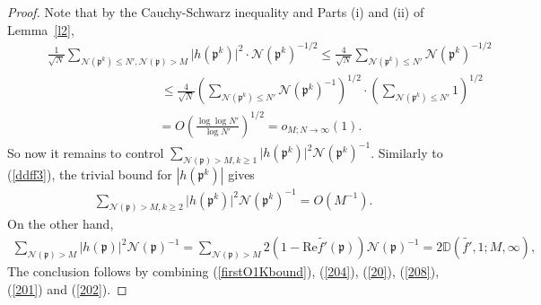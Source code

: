 \documentclass[11pt]{amsart}
\theoremstyle{definition}
\newcommand{\D}{{\mathbb D}}
\newcommand{\NN}{{\mathcal N}}
\newcommand{\mf}{\mathfrak}
\begin{document}
\begin{proof}
Note that by the Cauchy-Schwarz inequality and Parts (i) and (ii) of Lemma~\ref{l2},
\begin{equation}\label{208}
    \begin{split}
      &\qquad\frac{1}{\sqrt{N}}\sum_{\NN(\mf p^{k})\leq N', \NN(\mf p)>M}\vert h(\mf p^{k})\vert^{2}\cdot \NN(\mf p^{k})^{-1/2}
    \leq \frac{4}{\sqrt{N}}\sum_{\NN(\mf p^{k})\leq N'} \NN(\mf p^{k})^{-1/2}
       \\ & \quad\quad\quad\quad\quad\quad\quad\quad\quad\quad\quad\leq \frac{4}{\sqrt{N}}\left(\sum_{\NN(\mf p^{k})\leq N'} \NN(\mf p^{k})^{-1}\right)^{1/2}\cdot \left(\sum_{\NN(\mf p^{k})\leq N'} 1\right)^{1/2}
       \\&\quad\quad\quad\quad\quad\quad\quad\quad\quad\quad\;\;\;=O\left(\frac{\log\log N'}{\log N'}\right)^{1/2}=o_{M;N\to\infty}(1).
    \end{split}
\end{equation}
 So now it remains to control $\sum_{\NN(\mf p)>M, k\geq 1}\vert h(\mf p^{k})\vert^{2}\NN(\mf p^{k})^{-1}$. Similarly to (\ref{ddff3}), the trivial bound for $|h(\mf p^k)|$ gives
\begin{equation}\label{201}
    \begin{split}
       \sum_{\NN(\mf p)>M, k\geq 2}\vert h(\mf p^{k})\vert^{2}\NN(\mf p^{k})^{-1}=O(M^{-1}).
    \end{split}
\end{equation}
 On the other hand,
\begin{equation}\label{202}
    \begin{split}
\sum_{\NN(\mf p)>M}\vert h(\mf p)\vert^{2}\NN(\mf p)^{-1}=\sum_{\NN(\mf p)>M}2(1-\text{Re}\tilde{f'}( \mf p))\NN(\mf p)^{-1}=2\D(\tilde{f'},1;M,\infty),    
\end{split}
\end{equation}
The conclusion follows by
combining (\ref{firstO1Kbound}), (\ref{204}), (\ref{20}), (\ref{208}), (\ref{201}) and (\ref{202}).
\end{proof}

\iffalse
\end{document}
